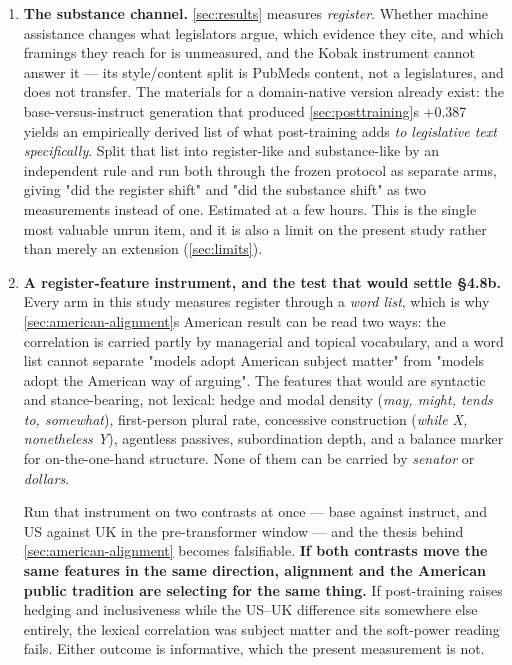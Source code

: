\begin{enumerate}
\def\labelenumi{\arabic{enumi}.}
\item
  \textbf{The substance channel.} \cref{sec:results} measures \emph{register}. Whether machine
  assistance changes what legislators argue, which evidence they cite, and
  which framings they reach for is unmeasured, and the Kobak instrument cannot
  answer it --- its style/content split is PubMed\textquotesingle s content, not a legislature\textquotesingle s,
  and does not transfer. The materials for a domain-native version already
  exist: the base-versus-instruct generation that produced \cref{sec:posttraining}\textquotesingle s +0.387 yields
  an empirically derived list of what post-training adds \emph{to legislative text
  specifically}. Split that list into register-like and substance-like by an
  independent rule and run both through the frozen protocol as separate arms,
  giving "did the register shift" and "did the substance shift" as two
  measurements instead of one. Estimated at a few hours. This is the single
  most valuable unrun item, and it is also a limit on the present study rather
  than merely an extension (\cref{sec:limits}).
\item
  \textbf{A register-feature instrument, and the test that would settle §4.8b.}
  Every arm in this study measures register through a \emph{word list}, which is
  why \cref{sec:american-alignment}\textquotesingle s American result can be read two ways: the correlation is carried
  partly by managerial and topical vocabulary, and a word list cannot separate
  "models adopt American subject matter" from "models adopt the American way
  of arguing". The features that would are syntactic and stance-bearing, not
  lexical: hedge and modal density (\emph{may, might, tends to, somewhat}),
  first-person plural rate, concessive construction (\emph{while X, nonetheless
  Y}), agentless passives, subordination depth, and a balance marker for
  on-the-one-hand structure. None of them can be carried by \emph{senator} or
  \emph{dollars}.

  Run that instrument on two contrasts at once --- base against instruct, and
  US against UK in the pre-transformer window --- and the thesis behind \cref{sec:american-alignment}
  becomes falsifiable. \textbf{If both contrasts move the same features in the same
  direction, alignment and the American public tradition are selecting for the
  same thing.} If post-training raises hedging and inclusiveness while the
  US--UK difference sits somewhere else entirely, the lexical correlation was
  subject matter and the soft-power reading fails. Either outcome is
  informative, which the present measurement is not.


\end{enumerate}
